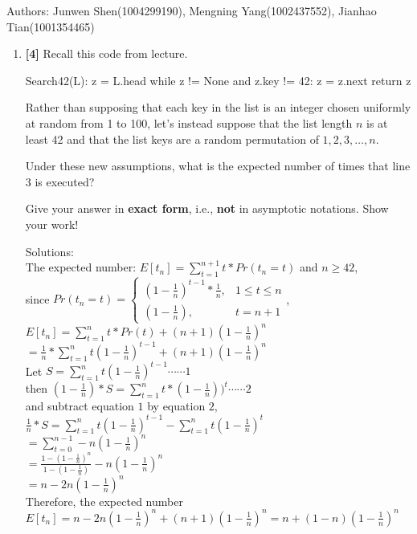 \documentclass{assignment-263}
\begin{document}
\think
\text Authors: Junwen Shen(1004299190), Mengning Yang(1002437552), Jianhao Tian(1001354465)
\begin{enumerate}

\item \textbf{[4]}
Recall this code from lecture.

\begin{python}
Search42(L):
  z = L.head
  while z != None and z.key != 42:
     z = z.next
  return z
\end{python}

Rather than supposing that each key in the list is an integer chosen uniformly at random from 1 to 100, let's instead suppose that the list length $n$ is at least 42 and that the list keys are a random permutation of $1, 2, 3, \ldots, n$.

Under these new assumptions, what is the expected number of times that line 3 is executed? 

Give your answer in \textbf{exact form}, i.e., \textbf{not} in asymptotic
		notations. Show your work!

Solutions:\\
The expected number: $E[t_n]=\sum_{t=1}^{n+1} t*Pr(t_n=t)$ and $n\geq 42$,\\
since $Pr(t_n=t)=\begin{cases} 
(1-\frac{1}{n})^{t-1}*\frac{1}{n},  & 1\leq t\leq n \\
(1-\frac{1}{n}), & t=n+1
\end{cases}$,\\
$E[t_n]=\sum_{t=1}^n t*Pr(t)+(n+1)(1-\frac{1}{n})^n$\\
$=\frac{1}{n}*\sum_{t=1}^n t(1-\frac{1}{n})^{t-1}+(n+1)(1-\frac{1}{n})^n$\\
Let $S=\sum_{t=1}^n t(1-\frac{1}{n})^{t-1}\cdots\cdots 1$\\
then $(1-\frac{1}{n})*S=\sum_{t=1}^n t*(1-\frac{1}{n}))^t\cdots\cdots 2$\\
and subtract equation $1$ by equation $2$,\\
$\frac{1}{n}*S=\sum_{t=1}^n t(1-\frac{1}{n})^{t-1}-\sum_{t=1}^n t(1-\frac{1}{n})^t$\\
$=\sum_{t=0}^{n-1}-n(1-\frac{1}{n})^n$\\
$=\frac{1-(1-\frac{1}{n})^n}{1-(1-\frac{1}{n})}-n(1-\frac{1}{n})^n$\\
$=n-2n(1-\frac{1}{n})^n$\\
Therefore, the expected number $E[t_n]=n-2n(1-\frac{1}{n})^n+(n+1)(1-\frac{1}{n})^n=n+(1-n)(1-\frac{1}{n})^n$\\


\end{enumerate}
\end{document}
